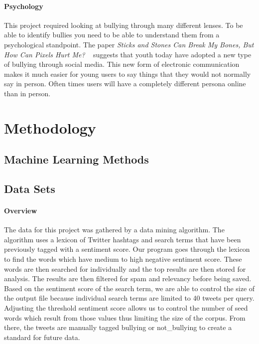 \documentclass[11pt,letterpaper]{article}
\begin{document}
\paragraph{Psychology}
This project required looking at bullying through many different lenses. To be able to identify bullies you need to be able to understand them from a psychological standpoint. The paper \textit{Sticks and Stones Can Break My Bones, But How Can Pixels Hurt Me?} ~\cite{PixelsHurtMe} suggests that youth today have adopted a new type of bullying through social media. This new form of electronic communication makes it much easier for young users to say things that they would not normally say in person. Often times users will have a completely different persona online than in person.



\section{Methodology}

\subsection{Machine Learning Methods}
\subsection{Data Sets}
\paragraph{Overview}
The data for this project was gathered by a data mining algorithm. The algorithm uses a lexicon of Twitter hashtags and search terms that have been previously tagged with a sentiment score. Our program goes through the lexicon to find the words which have medium to high negative sentiment score. These words are then searched for individually and the top results are then stored for analysis. The results are then filtered for spam and relevancy before being saved. Based on the sentiment score of the search term, we are able to control the size of the output file because individual search terms are limited to 40 tweets per query. Adjusting the threshold sentiment score allows us to control the number of seed words which result from those values thus limiting the size of the corpus. From there, the tweets are manually tagged bullying or not\_bullying to create a standard for future data.
\end{document}
